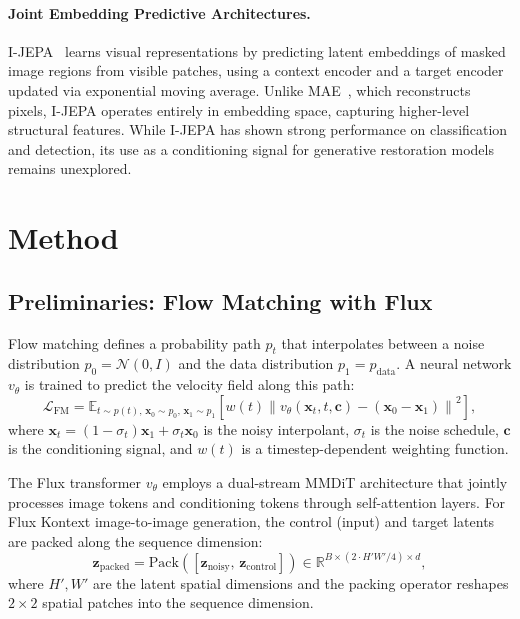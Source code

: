 \documentclass{article}
\begin{document}
\paragraph{Joint Embedding Predictive Architectures.}
I-JEPA~\cite{assran2023self} learns visual representations by predicting latent embeddings of masked image regions from visible patches, using a context encoder and a target encoder updated via exponential moving average. Unlike MAE~\cite{he2022masked}, which reconstructs pixels, I-JEPA operates entirely in embedding space, capturing higher-level structural features. While I-JEPA has shown strong performance on classification and detection, its use as a conditioning signal for generative restoration models remains unexplored.

\section{Method}
\label{sec:method}

\subsection{Preliminaries: Flow Matching with Flux}

Flow matching defines a probability path $p_t$ that interpolates between a noise distribution $p_0 = \mathcal{N}(0, I)$ and the data distribution $p_1 = p_{\text{data}}$. A neural network $v_\theta$ is trained to predict the velocity field along this path:
\begin{equation}
    \mathcal{L}_{\text{FM}} = \mathbb{E}_{t \sim p(t),\, \mathbf{x}_0 \sim p_0,\, \mathbf{x}_1 \sim p_1} \left[ w(t) \left\| v_\theta(\mathbf{x}_t, t, \mathbf{c}) - (\mathbf{x}_0 - \mathbf{x}_1) \right\|^2 \right],
    \label{eq:flow_matching}
\end{equation}
where $\mathbf{x}_t = (1 - \sigma_t) \mathbf{x}_1 + \sigma_t \mathbf{x}_0$ is the noisy interpolant, $\sigma_t$ is the noise schedule, $\mathbf{c}$ is the conditioning signal, and $w(t)$ is a timestep-dependent weighting function.

The Flux transformer $v_\theta$ employs a dual-stream MMDiT architecture that jointly processes image tokens and conditioning tokens through self-attention layers. For Flux Kontext image-to-image generation, the control (input) and target latents are packed along the sequence dimension:
\begin{equation}
    \mathbf{z}_{\text{packed}} = \text{Pack}\left([\mathbf{z}_{\text{noisy}},\, \mathbf{z}_{\text{control}}]\right) \in \mathbb{R}^{B \times (2 \cdot H'W'/4) \times d},
    \label{eq:packing}
\end{equation}
where $H', W'$ are the latent spatial dimensions and the packing operator reshapes $2\times2$ spatial patches into the sequence dimension.
\end{document}
